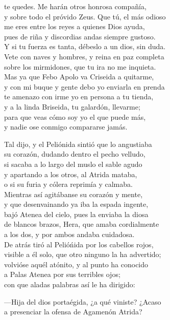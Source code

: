 te quedes. Me harán otros honrosa compañía,\\
y sobre todo el próvido Zeus. Que tú, el más odioso\\
me eres entre los reyes a quienes Dios ayuda,\\
pues de riña y discordias andas siempre gustoso.\\
Y si tu fuerza es tanta, débeslo a un dios, sin duda.\\
Vete con naves y hombres, y reina en paz completa\\
sobre los mirmidones, que tu ira no me inquieta.\\
Mas ya que Febo Apolo va Criseida a quitarme,\\
y con mi buque y gente debo yo enviarla en prenda\\
te amenazo con irme yo en persona a tu tienda,\\
y a la linda Briseida, tu galardón, llevarme;\\
para que veas cómo soy yo el que puede más,\\
y nadie ose conmigo compararse jamás.\par
Tal dijo, y el Peliónida sintió que lo angustiaba\\
su corazón, dudando dentro el pecho velludo,\\
si sacaba a lo largo del muslo el sable agudo\\
y apartando a los otros, al Atrida mataba,\\
o si su furia y cólera reprimía y calmaba.\\
Mientras así agitábanse su corazón y mente,\\
y que desenvainando ya iba la espada ingente,\\
bajó Atenea del cielo, pues la enviaba la diosa\\
de blancos brazos, Hera, que amaba cordialmente\\
a los dos, y por ambos andaba cuidadosa.\\
De atrás tiró al Pelióńida por los cabellos rojos,\\
visible a él solo, que otro ninguno la ha advertido;\\
volvióse aquél atónito, y al punto ha conocido\\
a Palas Atenea por sus terribles ojos;\\
con que aladas palabras así le ha dirigido:\par
---Hija del dios portaégida, ¿a qué viniste? ¿Acaso\\
a presenciar la ofensa de Agamenón Atrida?\\
